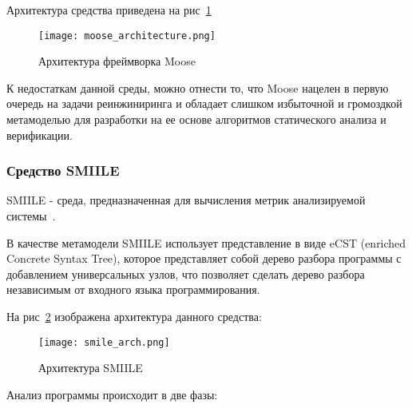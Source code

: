 Архитектура средства приведена на рис~\ref{fig:moose_architecture}

\begin{figure}[ht!]
    \begin{center}
        \texttt{[image: moose\_architecture.png]}
    \end{center}
    \caption{Архитектура фреймворка Moose}
    \label{fig:moose_architecture}
\end{figure}

К недостаткам данной среды, можно отнести то, что Moose нацелен в первую очередь
на задачи реинжиниринга и обладает слишком избыточной и громоздкой метамоделью
для разработки на ее основе алгоритмов статического анализа и верификации.

\subsubsection{Средство SMIILE}



SMIILE - среда, предназначенная для вычисления метрик анализируемой
системы~\cite{smile}.

В качестве метамодели SMIILE использует представление в виде eCST (enriched
Concrete Syntax Tree), которое представляет собой дерево разбора программы с
добавлением универсальных узлов, что позволяет сделать дерево разбора
независимым от входного языка программирования.

На рис~\ref{fig:smile_arch} изображена архитектура данного средства:

\begin{figure}[ht!]
    \begin{center}
        \texttt{[image: smile\_arch.png]}
    \end{center}
    \caption{Архитектура SMIILE}
    \label{fig:smile_arch}
\end{figure}

Анализ программы происходит в две фазы:


